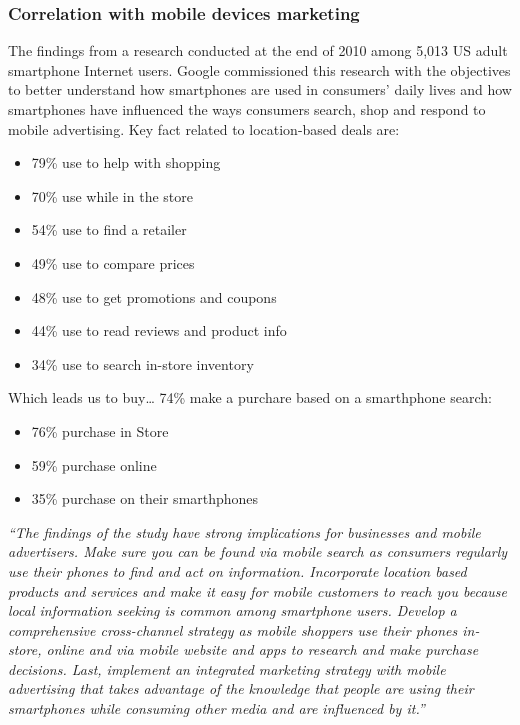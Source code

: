 \subsubsection{Correlation with mobile devices marketing}
The findings from a research conducted at the end of 2010 among 5,013 US adult
smartphone Internet users. Google commissioned this research with the objectives
to better understand how smartphones are used in consumers’ daily lives and how
smartphones have influenced the ways consumers search, shop and respond to mobile
advertising. Key fact related to location-based deals are:
\begin{itemize}[itemsep=1pt, parsep=1pt]
  \item 79\% use to help with shopping
  \item 70\% use while in the store
  \item 54\% use to find a retailer
  \item 49\% use to compare prices
  \item 48\% use to get promotions and coupons
  \item 44\% use to read reviews and product info
  \item 34\% use to search in-store inventory
\end{itemize}

Which leads us to buy… 74\% make a purchare based on a smarthphone search:

\begin{itemize}[itemsep=1pt, parsep=1pt]
  \item 76\% purchase in Store
  \item 59\% purchase online
  \item 35\% purchase on their smarthphones
\end{itemize}

\emph{``The findings of the study have strong implications for businesses and
mobile advertisers. Make sure you can be found via mobile search as consumers regularly
use their phones to find and act on information. Incorporate location based
products and services and make it easy for mobile customers to reach you because
local information seeking is common among smartphone users.  Develop a
comprehensive cross-channel strategy as mobile shoppers use their phones
in-store, online and via mobile website and apps to research and make purchase
decisions.  Last, implement an integrated marketing strategy with mobile
advertising that takes advantage of the knowledge that people are using their
smartphones while consuming other media and are influenced by it.''}
\cite{geolocation:geomarketing:google:study}

